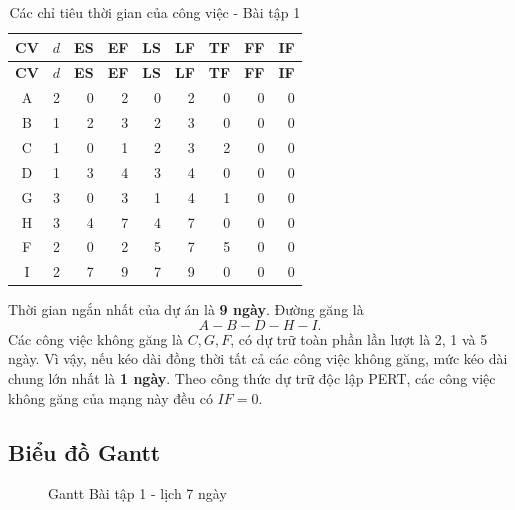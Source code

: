 \begin{longtable}{c|r|rr|rr|rrr}
\caption{Các chỉ tiêu thời gian của công việc - Bài tập 1}\\
\toprule
\textbf{CV}&\textbf{$d$}&\textbf{ES}&\textbf{EF}&\textbf{LS}&\textbf{LF}&\textbf{TF}&\textbf{FF}&\textbf{IF}\\
\midrule
\endfirsthead
\toprule
\textbf{CV}&\textbf{$d$}&\textbf{ES}&\textbf{EF}&\textbf{LS}&\textbf{LF}&\textbf{TF}&\textbf{FF}&\textbf{IF}\\
\midrule
\endhead
A&2&0&2&0&2&0&0&0\\
B&1&2&3&2&3&0&0&0\\
C&1&0&1&2&3&2&0&0\\
D&1&3&4&3&4&0&0&0\\
G&3&0&3&1&4&1&0&0\\
H&3&4&7&4&7&0&0&0\\
F&2&0&2&5&7&5&0&0\\
I&2&7&9&7&9&0&0&0\\
\bottomrule
\end{longtable}

Thời gian ngắn nhất của dự án là \textbf{9 ngày}. Đường găng là
\[
  \boxed{A-B-D-H-I}.
\]
Các công việc không găng là $C,G,F$, có dự trữ toàn phần lần lượt là
2, 1 và 5 ngày. Vì vậy, nếu kéo dài đồng thời tất cả các công việc không
găng, mức kéo dài chung lớn nhất là \textbf{1 ngày}. Theo công thức dự trữ
độc lập PERT, các công việc không găng của mạng này đều có $IF=0$.

\subsection{Biểu đồ Gantt}

\begin{figure}[H]\centering
{}
\caption{Gantt Bài tập 1 - lịch 7 ngày}
\end{figure}

